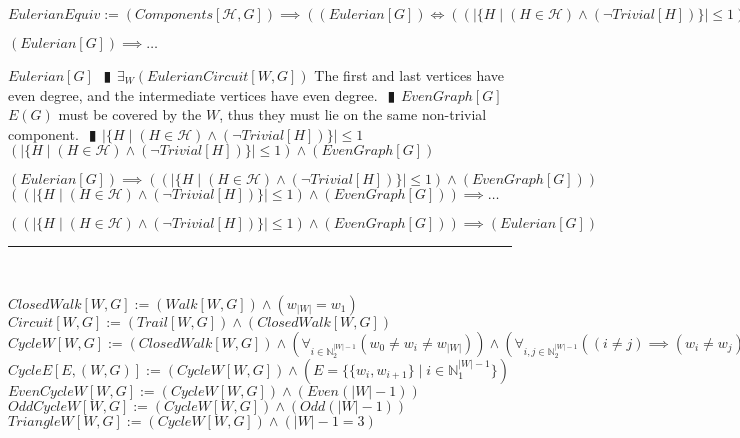 \documentclass{book}
\newcommand{\abr}{:=}
\newcommand{\pipe}{$\phantom{(}\vrectangleblack\phantom{)}$}
\newcommand{\pr}[1]{\left(#1\right)}
\newcommand{\st}{\mathbin{|}}
\newcommand{\utup}[1]{\{#1\}}
\begin{document}
$EulerianEquiv \abr (Components[\mathcal{H}, G]) \implies \pr{(Eulerian[G]) \iff \pr{\pr{|\{H \st (H \in \mathcal{H}) \land (\lnot Trivial[H])\}| \leq 1} \land (EvenGraph[G])}}$
\begin{enumerate}
  \lit $(Eulerian[G]) \implies \ldots$
  \begin{enumerate}
    \lit $Eulerian[G]$ \pipe $\exists_{W}(EulerianCircuit[W, G])$
    \lit The first and last vertices have even degree, and the intermediate vertices have even degree. \pipe $EvenGraph[G]$
    \lit $E(G)$ must be covered by the $W$, thus they must lie on the same non-trivial component. \pipe $|\{H \st (H \in \mathcal{H}) \land (\lnot Trivial[H])\}| \leq 1$
    \lit $\pr{|\{H \st (H \in \mathcal{H}) \land (\lnot Trivial[H])\}| \leq 1} \land (EvenGraph[G])$
  \end{enumerate}
  \lit $(Eulerian[G]) \implies \pr{\pr{|\{H \st (H \in \mathcal{H}) \land (\lnot Trivial[H])\}| \leq 1} \land (EvenGraph[G])}$
  \lit $\pr{\pr{|\{H \st (H \in \mathcal{H}) \land (\lnot Trivial[H])\}| \leq 1} \land (EvenGraph[G])} \implies \ldots$
  \begin{enumerate}
    \lit 
  \end{enumerate}
  \lit $\pr{\pr{|\{H \st (H \in \mathcal{H}) \land (\lnot Trivial[H])\}| \leq 1} \land (EvenGraph[G])} \implies (Eulerian[G])$

\end{enumerate} \vspace{.75mm} \hrule \vspace{.75mm} \ \\ 




\newpage


$ClosedWalk[W, G] \abr (Walk[W, G]) \land (w_{|W|} = w_1)$ \\
$Circuit[W, G] \abr (Trail[W, G]) \land (ClosedWalk[W, G])$ \\
$CycleW[W, G] \abr (ClosedWalk[W, G]) \land \pr{\forall_{i \in \mathbb{N}_2^{|W| - 1}}(w_0 \neq w_i \neq w_{|W|})} \land \pr{\forall_{i, j \in \mathbb{N}_2^{|W| - 1}}\pr{(i \neq j) \implies (w_i \neq w_j)}} \land (|W| - 1 \geq 3)$ \\
$CycleE[E, (W, G)] \abr (CycleW[W, G]) \land (E = \{\utup{w_i, w_{i + 1}} \st i \in \mathbb{N}_1^{|W| - 1}\})$ \\
$EvenCycleW[W, G] \abr (CycleW[W, G]) \land \pr{Even(|W| - 1)}$ \\
$OddCycleW[W, G] \abr (CycleW[W, G]) \land \pr{Odd(|W| - 1)}$ \\
$TriangleW[W, G] \abr (CycleW[W, G]) \land (|W| - 1 = 3)$ \\
\end{document}
